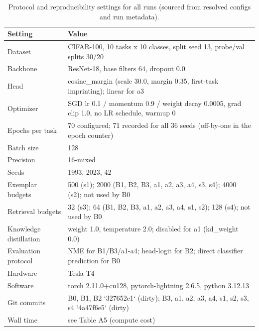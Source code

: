 \documentclass{article}
\begin{document}
\begin{table}[htbp]
  \centering
  \caption{Protocol and reproducibility settings for all runs (sourced from resolved configs and run metadata).}
  \label{tab:A1_protocol}
  \begin{tabular}{ll}
    \toprule
    \textbf{Setting} & \textbf{Value} \\
    \midrule
    Dataset & CIFAR-100, 10 tasks x 10 classes, split seed 13, probe/val splits 30/20 \\
    Backbone & ResNet-18, base filters 64, dropout 0.0 \\
    Head & cosine\_margin (scale 30.0, margin 0.35, first-task imprinting); linear for a3 \\
    Optimizer & SGD lr 0.1 / momentum 0.9 / weight decay 0.0005, grad clip 1.0, no LR schedule, warmup 0 \\
    Epochs per task & 70 configured; 71 recorded for all 36 seeds (off-by-one in the epoch counter) \\
    Batch size & 128 \\
    Precision & 16-mixed \\
    Seeds & 1993, 2023, 42 \\
    Exemplar budgets & 500 (s1); 2000 (B1, B2, B3, a1, a2, a3, a4, s3, s4); 4000 (s2); not used by B0 \\
    Retrieval budgets & 32 (s3); 64 (B1, B2, B3, a1, a2, a3, a4, s1, s2); 128 (s4); not used by B0 \\
    Knowledge distillation & weight 1.0, temperature 2.0; disabled for a1 (kd\_weight 0.0) \\
    Evaluation protocol & NME for B1/B3/a1-a4; head-logit for B2; direct classifier prediction for B0 \\
    Hardware & Tesla T4 \\
    Software & torch 2.11.0+cu128, pytorch-lightning 2.6.5, python 3.12.13 \\
    Git commits & B0, B1, B2 `327652e1` (dirty); B3, a1, a2, a3, a4, s1, s2, s3, s4 `4a47f6e5` (dirty) \\
    Wall time & see Table A5 (compute cost) \\
    \bottomrule
  \end{tabular}
\end{table}
\end{document}
